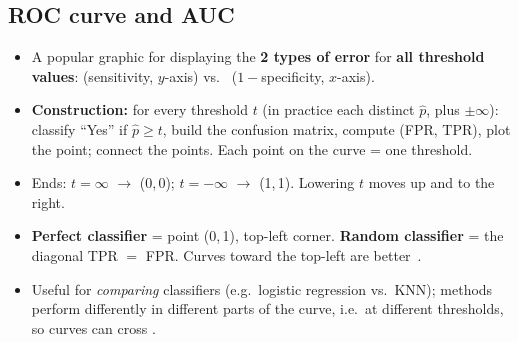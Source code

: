 \subsection{ROC curve and AUC}
\begin{keybox}
\begin{itemize}
\item A popular graphic for displaying the \textbf{2 types of error} for \textbf{all threshold values}:
   (sensitivity, $y$-axis) vs.\  ($1-$specificity, $x$-axis).
\item \textbf{Construction:} for every threshold $t$ (in practice each distinct $\hat p$, plus $\pm\infty$):
  classify ``Yes'' if $\hat p\ge t$, build the confusion matrix, compute (FPR, TPR), plot the point; connect the points.
  Each point on the curve = one threshold.
\item Ends: $t=\infty$ $\to$ (0,\,0); $t=-\infty$ $\to$ (1,\,1). Lowering $t$ moves up and to the right.
\item \textbf{Perfect classifier} = point (0,\,1), top-left corner. \textbf{Random classifier} = the diagonal
  TPR $=$ FPR. Curves toward the top-left are better \,.
\item Useful for \emph{comparing} classifiers (e.g.\ logistic regression vs.\ KNN); methods perform differently in
  different parts of the curve, i.e.\ at different thresholds, so curves can cross .
\end{itemize}
\end{keybox}


